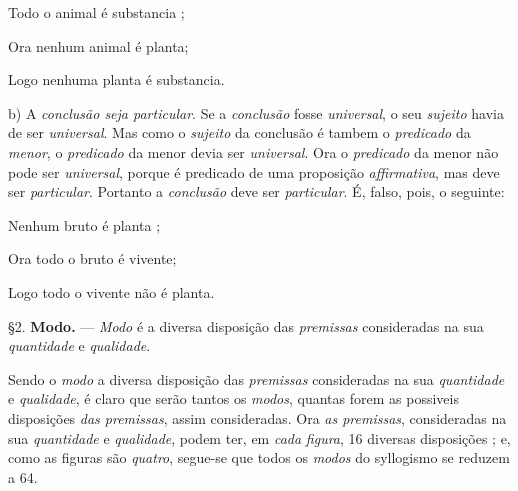 Todo o animal é substancia ;

Ora nenhum animal é planta;

Logo nenhuma planta é substancia.

b) A \emph{conclusão seja particular}. Se a \emph{conclusão} fosse \emph{universal}, o seu \emph{sujeito} havia de ser \emph{universal}. Mas como o \emph{sujeito} da conclusão é tambem o \emph{predicado} da \emph{menor}, o \emph{predicado} da menor devia ser \emph{universal}. Ora o \emph{predicado} da menor não pode ser \emph{universal}, porque é predicado de uma proposição \emph{affirmativa}, mas deve ser \emph{particular}. Portanto a \emph{conclusão} deve ser \emph{particular}. É, falso, pois, o seguinte:

Nenhum bruto é planta ;

Ora todo o bruto é vivente;

Logo todo o vivente não é planta.

§2. \textbf{Modo.} --- \emph{Modo} é a diversa disposição das \emph{premissas} consideradas na sua \emph{quantidade} e \emph{qualidade}.


Sendo o \emph{modo} a diversa disposição das \emph{premissas} consideradas na sua \emph{quantidade} e \emph{qualidade}, é claro que serão tantos os \emph{modos}, quantas forem as possiveis disposições \emph{das premissas}, assim consideradas. Ora \emph{as premissas}, consideradas na sua \emph{quantidade} e \emph{qualidade}, podem ter, em \emph{cada}     \emph{figura}, 16 diversas disposições ; e, como as figuras são \emph{quatro}, segue-se que todos os \emph{modos} do syllogismo se reduzem a 64.

